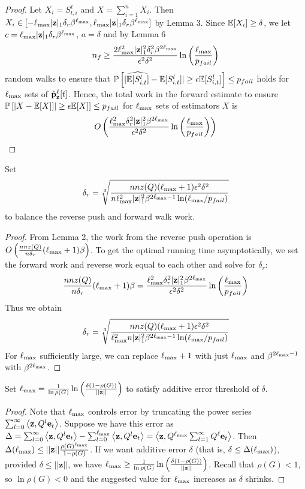 \begin{proof}
Let $X_i = S_{t, i}^{\ell}$ and $X = \sum_{i=1}^n X_i$. Then $X_i \in [-\ell_{\max}|\mathbf{z}|_1\delta_r \beta^{\ell_{\max}}, \ell_{\max}|\mathbf{z}|_1\delta_r \beta^{\ell_{\max}}]$ by Lemma 3. Since ${\mathbb{E}}[X_i] \geq \delta$, we let $c = \ell_{\max} |\mathbf{z}|_1\delta_r \beta^{\ell_{\max}}$, $a = \delta$ and by Lemma 6
$$n_f \geq \frac{2 \ell_{\max}^2|\mathbf{z}|_1^2 \delta_r^2 \beta^{2\ell_{\max}}}{\epsilon^2\delta^2}\ln \left(\frac{\ell_{\max}}{p_{fail}}\right)$$
random walks to ensure that $\mathbb{P}\left[ | \widehat{{\mathbb{E}}[S_{i, t}^l]}  -  {\mathbb{E}}[S_{i, t}^l]|  \geq  \epsilon  {\mathbb{E}}[S_{i, t}^l] \right] \leq p_{fail}$ holds for $\ell_{\max}$ sets of $\hat{\mathbf{p}}_\mathbf{z}^{\ell}[t]$.
Hence, the total work in the forward estimate to ensure 
$\mathbb{P}\left[ |X -  {\mathbb{E}}[X]]|  \geq  \epsilon  {\mathbb{E}}[X] \right] \leq p_{fail}$ for $\ell_{\max}$ sets of estimators $X$ is
$${O}\left(\frac{\ell_{\max}^2 \delta_r^2|\mathbf{z}|_1^2 \beta^{2\ell_{\max}}}{\epsilon^2\delta^2}\ln \left(\frac{\ell_{\max}}{p_{fail}}\right)\right)$$
\end{proof}

\begin{lemma}
Set 
$$\delta_r = \sqrt[3]{\frac{nnz(Q)(\ell_{\max} + 1) \epsilon^2\delta^2}{n\ell_{\max}^2 |\mathbf{z}|_1^2\beta^{2\ell_{\max} - 1}\ln(\ell_{\max}/p_{fail}) } }$$
to balance the reverse push and forward walk work.
\end{lemma}
\begin{proof}
From Lemma 2, the work from the reverse push operation is
$O\left(\frac{nnz(Q)}{n\delta_r}(\ell_{\max}+1)\beta\right)$.
To get the optimal running time asymptotically, we set the forward work and reverse work equal to each other and solve for $\delta_r$:
\[\frac{nnz(Q)}{n\delta_r}(\ell_{\max}+1)\beta = \frac{\ell_{\max}^2 \delta_r^2|\mathbf{z}|_1^2 \beta^{2\ell_{\max}}}{\epsilon^2\delta^2}\ln \left(\frac{\ell_{\max}}{p_{fail}}\right) \]
Thus we obtain
\begin{equation*}
\delta_r = \sqrt[3]{\frac{nnz(Q)(\ell_{\max} + 1) \epsilon^2\delta^2}{\ell_{\max}^2 n|\mathbf{z}|_1^2\beta^{2\ell_{\max} -1}\ln(\ell_{\max}/p_{fail}) } }
\end{equation*}
For $\ell_{\max}$ sufficiently large, we can replace $\ell_{\max} + 1$ with just $\ell_{\max}$ and $\beta^{2\ell_{\max} -1}$ with $\beta^{2\ell_{\max}}$.
\end{proof}



\begin{lemma}
Set $\ell_{\max} = \frac{1}{\ln \rho(G)} \ln \left(\frac{\delta(1 - \rho(G))}{||\mathbf{z}||} \right)$  to satisfy additive error threshold of $\delta$.
\end{lemma}
\begin{proof}
Note that $\ell_{\max}$ controls error by truncating the power series $\sum_{l=0}^\infty \left< \mathbf{z}, Q^l\mathbf{e}_t \right>$.
Suppose we have this error as $\Delta =\sum_{l=0}^\infty \left< \mathbf{z}, Q^l\mathbf{e}_t \right> - \sum_{l=0}^{\ell_{\max}} \left< \mathbf{z}, Q^l\mathbf{e}_t \right> = \left< \mathbf{z}, Q^{\ell_{\max}} \sum_{l=1}^\infty Q^{\ell} \mathbf{e}_t \right>$.
Then $\Delta(\ell_{\max}) \leq ||\mathbf{z}|| \frac{\rho(G)^{\ell_{\max}}}{1 - \rho(G)}$.
If we want additive error $\delta$ (that is, $ \delta \leq \Delta(\ell_{\max})$), provided $\delta \leq ||\mathbf{z}||$, we have
$\ell_{\max} \geq \frac{1}{\ln \rho(G)} \ln \left(\frac{\delta(1 - \rho(G))}{||\mathbf{z}||} \right)$.
Recall that $\rho(G) < 1$, so $\ln \rho(G) < 0$ and the suggested value for $\ell_{\max}$ increases as $\delta$ shrinks.
\end{proof}
